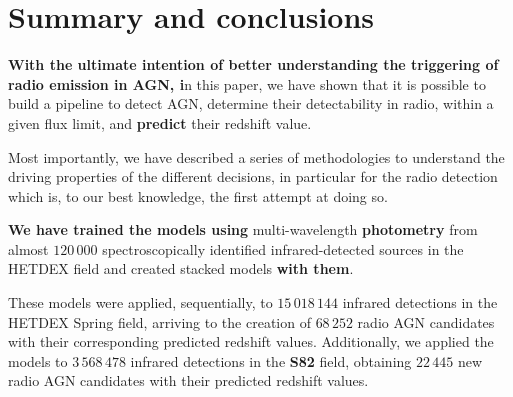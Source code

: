 \documentclass{aa}
\begin{document}




 
\section{Summary and conclusions}\label{sec:summary_conclusions}

\textbf{With the ultimate intention of better understanding the triggering of radio emission in AGN, i}n this paper, we have shown that it is possible to build a pipeline to detect AGN, determine their detectability in radio, within a given flux limit, and \textbf{predict} their redshift value. 

Most importantly, we have described a series of methodologies to understand the driving properties of the different decisions, in particular for the radio detection which is, to our best knowledge, the first attempt at doing so.

\textbf{We have trained the models using} multi-wavelength \textbf{photometry} from almost $120\,000$ spectroscopically identified infrared-detected sources in the HETDEX field and created stacked models \textbf{with them}.

These models were applied, sequentially, to $15\,018\,144$ infrared detections in the HETDEX Spring field, arriving to the creation of $68\,252$ radio AGN candidates with their corresponding predicted redshift values. Additionally, we applied the models to $3\,568\,478$ infrared detections in the \textbf{S82} field, obtaining $22\,445$ new radio AGN candidates with their predicted redshift values.
\end{document}
